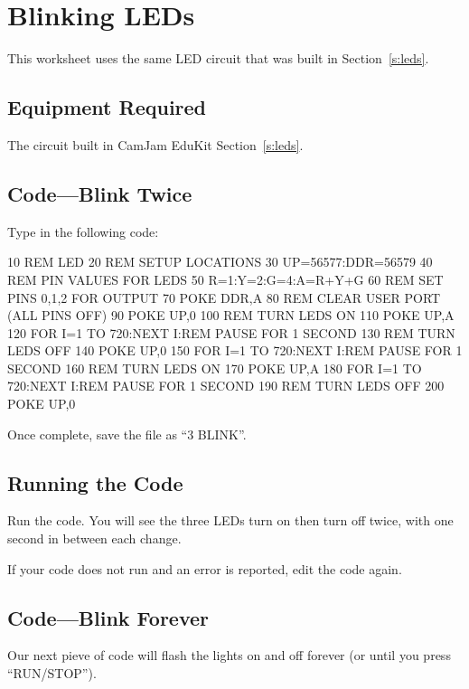 \section{Blinking LEDs}


This worksheet uses the same LED circuit that was built in Section~\ref{s:leds}.

\subsection*{Equipment Required}

The circuit built in CamJam EduKit Section~\ref{s:leds}.

\subsection*{Code---Blink Twice}

Type in the following code:
\begin{basic}
10 REM LED
20 REM SETUP LOCATIONS
30 UP=56577:DDR=56579
40 REM PIN VALUES FOR LEDS
50 R=1:Y=2:G=4:A=R+Y+G
60 REM SET PINS 0,1,2 FOR OUTPUT
70 POKE DDR,A
80 REM CLEAR USER PORT (ALL PINS OFF)
90 POKE UP,0
100 REM TURN LEDS ON
110 POKE UP,A
120 FOR I=1 TO 720:NEXT I:REM PAUSE FOR 1 SECOND
130 REM TURN LEDS OFF
140 POKE UP,0
150 FOR I=1 TO 720:NEXT I:REM PAUSE FOR 1 SECOND
160 REM TURN LEDS ON
170 POKE UP,A
180 FOR I=1 TO 720:NEXT I:REM PAUSE FOR 1 SECOND
190 REM TURN LEDS OFF
200 POKE UP,0
\end{basic}

Once complete, save the file as ``3 BLINK''.

\subsection*{Running the Code}

Run the code.  You will see the three LEDs turn on then turn off twice, with one second in between each change.

If your code does not run and an error is reported, edit the code again.

\subsection*{Code---Blink Forever}

Our next pieve of code will flash the lights on and off forever (or until you press ``RUN/STOP'').

